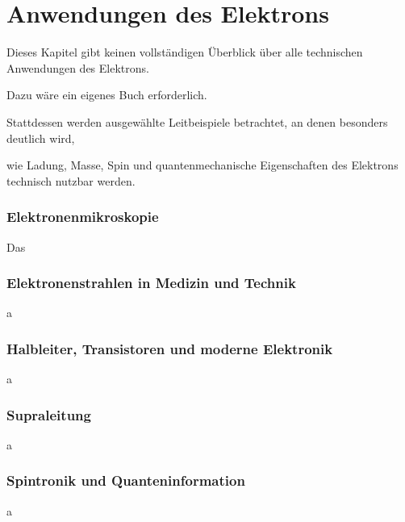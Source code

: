 \chapter{ Anwendungen des Elektrons}

Dieses Kapitel gibt keinen vollständigen Überblick über alle technischen Anwendungen des Elektrons.

Dazu wäre ein eigenes Buch erforderlich.

Stattdessen werden ausgewählte Leitbeispiele betrachtet, an denen besonders deutlich wird,

wie Ladung, Masse, Spin und quantenmechanische Eigenschaften des Elektrons technisch nutzbar werden.

\subsection{Elektronenmikroskopie}

Das
\subsection{Elektronenstrahlen in Medizin und Technik}
a
\subsection{Halbleiter, Transistoren und moderne Elektronik}
a
\subsection{Supraleitung}
a
\subsection{Spintronik und Quanteninformation}
a


